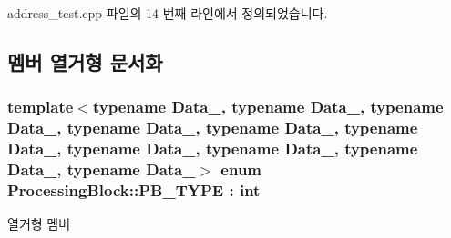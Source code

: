 address\+\_\+test.\+cpp 파일의 14 번째 라인에서 정의되었습니다.



\subsection{멤버 열거형 문서화}
\subsubsection[{\texorpdfstring{P\+B\+\_\+\+T\+Y\+PE}{PB_TYPE}}]{\setlength{\rightskip}{0pt plus 5cm}template$<$typename Data\+\_, typename Data\+\_, typename Data\+\_, typename Data\+\_, typename Data\+\_, typename Data\+\_, typename Data\+\_, typename Data\+\_, typename Data\+\_, typename Data\+\_$>$ enum {\bf Processing\+Block\+::\+P\+B\+\_\+\+T\+Y\+PE} \+: int}\hypertarget{classProcessingBlock_a7101250aa8b5a80fb331ea50ddabda01}{}\label{classProcessingBlock_a7101250aa8b5a80fb331ea50ddabda01}
\begin{Desc}
\item[열거형 멤버]\par
\begin{description}
\item[{\em 
S\+O\+U\+R\+CE\hypertarget{classProcessingBlock_a7101250aa8b5a80fb331ea50ddabda01a4591f1828300dd01148df46297fca9a3}{}\label{classProcessingBlock_a7101250aa8b5a80fb331ea50ddabda01a4591f1828300dd01148df46297fca9a3}
}]\item[{\em 
N\+O\+R\+M\+AL\hypertarget{classProcessingBlock_a7101250aa8b5a80fb331ea50ddabda01afa0a5bb3bc7be7ed974375040245673c}{}\label{classProcessingBlock_a7101250aa8b5a80fb331ea50ddabda01afa0a5bb3bc7be7ed974375040245673c}
}]\item[{\em 
S\+I\+NK\hypertarget{classProcessingBlock_a7101250aa8b5a80fb331ea50ddabda01a0fe46c9c9004b40629b43e11e6acfb25}{}\label{classProcessingBlock_a7101250aa8b5a80fb331ea50ddabda01a0fe46c9c9004b40629b43e11e6acfb25}
}]\end{description}
\end{Desc}


